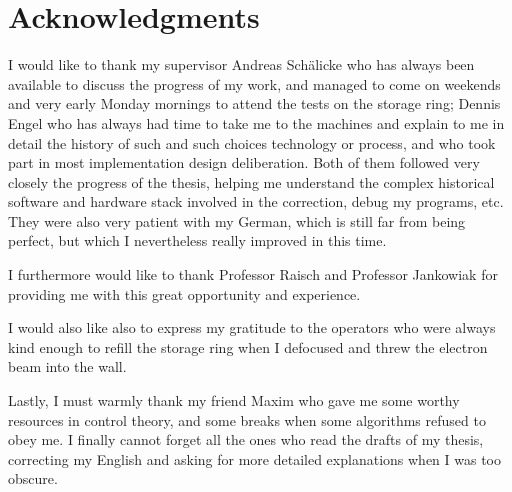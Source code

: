 
\chapter*{Acknowledgments}

I would like to thank my supervisor Andreas Schälicke who has always been available to discuss the progress of my work, and managed to come on weekends and very early Monday mornings to attend the tests on the storage ring; Dennis Engel who has always had time to take me to the machines and explain to me in detail the history of such and such choices technology or process, and who took part in most implementation design deliberation. Both of them followed very closely the progress of the thesis, helping me understand the complex historical software and hardware stack involved in the correction, debug my programs, etc. They were also very patient with my German, which is still far from being perfect, but which I nevertheless really improved in this time.

I furthermore would like to thank Professor Raisch and Professor Jankowiak for providing me with this great opportunity and experience.

I would also like also to express my gratitude to the operators who were always kind enough to refill the storage ring when I defocused and threw the electron beam into the wall.

Lastly, I must warmly thank my friend Maxim who gave me some worthy resources in control theory, and some breaks when some algorithms refused to obey me. I finally cannot forget all the ones who read the drafts of my thesis, correcting my English and asking for more detailed explanations when I was too obscure.

